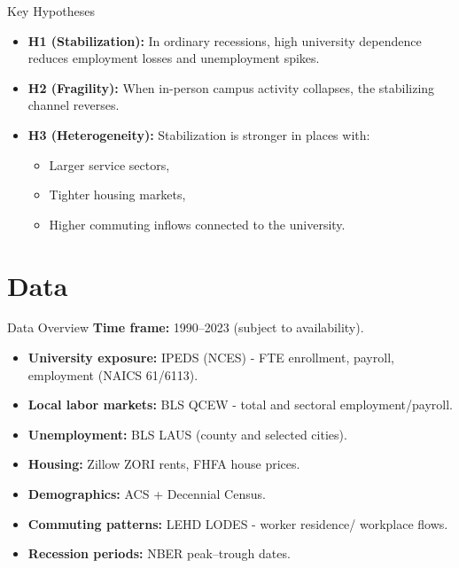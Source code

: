 \documentclass[10pt,compress]{beamer}
\begin{document}
\begin{frame}{Key Hypotheses}
	\begin{itemize}
		\item \textbf{H1 (Stabilization):} In ordinary recessions, high university dependence reduces employment losses and unemployment spikes.
		\item \textbf{H2 (Fragility):} When in-person campus activity collapses, the stabilizing channel reverses.
		\item \textbf{H3 (Heterogeneity):} Stabilization is stronger in places with:
		\begin{itemize}
			\item Larger service sectors,
			\item Tighter housing markets,
			\item Higher commuting inflows connected to the university.
		\end{itemize}
	\end{itemize}
\end{frame}

\section{Data}

\begin{frame}{Data Overview}
	\textbf{Time frame:} 1990–2023 (subject to availability). \\
	\vspace{0.2cm}
	\begin{itemize}
		\item \textbf{University exposure:} IPEDS (NCES) - FTE enrollment, payroll, employment (NAICS 61/6113).
		\item \textbf{Local labor markets:} BLS QCEW - total and sectoral employment/payroll.
		\item \textbf{Unemployment:} BLS LAUS (county and selected cities).
		\item \textbf{Housing:} Zillow ZORI rents, FHFA house prices.
		\item \textbf{Demographics:} ACS + Decennial Census.
		\item \textbf{Commuting patterns:} LEHD LODES - worker residence/ workplace flows.
		\item \textbf{Recession periods:} NBER peak–trough dates.
	\end{itemize}
\end{frame}
\end{document}
